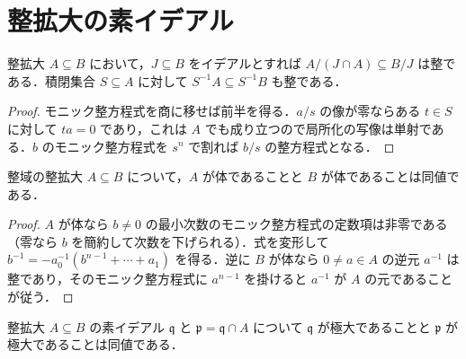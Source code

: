 \section{整拡大の素イデアル}
\begin{prop}[整拡大と商及び局所化]
整拡大 $A\subseteq B$ において，$J\subseteq B$ をイデアルとすれば $A/(J\cap A)\subseteq B/J$ は整である．積閉集合 $S\subseteq A$ に対して $S^{-1}A\subseteq S^{-1}B$ も整である．
\end{prop}
\begin{proof}
モニック整方程式を商に移せば前半を得る．$a/s$ の像が零ならある $t\in S$ に対して $ta=0$ であり，これは $A$ でも成り立つので局所化の写像は単射である．$b$ のモニック整方程式を $s^n$ で割れば $b/s$ の整方程式となる．
\end{proof}
\begin{prop}[整域の整拡大と体性]
整域の整拡大 $A\subseteq B$ について，$A$ が体であることと $B$ が体であることは同値である．
\end{prop}
\begin{proof}
$A$ が体なら $b\ne0$ の最小次数のモニック整方程式の定数項は非零である（零なら $b$ を簡約して次数を下げられる）．式を変形して $b^{-1}=-a_0^{-1}(b^{n-1}+\cdots+a_1)$ を得る．逆に $B$ が体なら $0\ne a\in A$ の逆元 $a^{-1}$ は整であり，そのモニック整方程式に $a^{n-1}$ を掛けると $a^{-1}$ が $A$ の元であることが従う．
\end{proof}
\begin{prop}[極大イデアルの縮小]
整拡大 $A\subseteq B$ の素イデアル $\mathfrak q$ と $\mathfrak p=\mathfrak q\cap A$ について $\mathfrak q$ が極大であることと $\mathfrak p$ が極大であることは同値である．
\end{prop}

